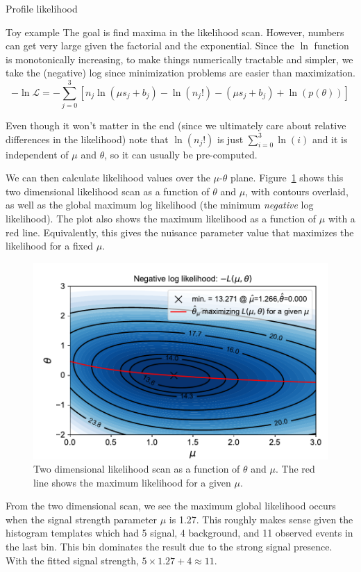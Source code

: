 \begin{section}{Profile likelihood}
\begin{subsection}{Toy example}
The goal is find maxima in the likelihood scan. However, numbers can get very
large given the factorial and the exponential. Since the $\ln$
function is monotonically increasing, to make things numerically
tractable and simpler, we take the (negative) log
since minimization problems are easier than maximization. 
\begin{equation}
-\ln\mathcal{L}=-\sum_{j=0}^{3}\left[
n_j \ln(\mu s_j + b_j) - \ln(n_j!) - (\mu s_j + b_j) + \ln(p(\theta))
\right]
\end{equation}


Even though it won't matter in the end (since we ultimately care about
relative differences in the likelihood) note that $\ln(n_j!)$ is just
$\sum_{i=0}^{3}\ln(i)$ and it is independent of $\mu$ and
$\theta$, so it can usually be pre-computed.

We can then calculate likelihood values over the $\mu$-$\theta$ plane. 
Figure~\ref{fig:toystat:2dlikelihood} shows this two dimensional
likelihood scan as a function of $\theta$ and $\mu$, with contours overlaid,
as well as the global maximum log likelihood (the
minimum \emph{negative} log likelihood).
The plot also shows the maximum likelihood as a function of $\mu$
with a red line. Equivalently, this gives the nuisance parameter value that
maximizes the likelihood for a fixed $\mu$.

\begin{figure}[!htb]
    \centering
    \includegraphics[width=0.80\linewidth]{figs/toy_statistics/likelihood_theta_vs_mu.pdf}
    \caption{
Two dimensional likelihood scan as a function of $\theta$ and $\mu$. The red line
shows the maximum likelihood for a given $\mu$.
    }
    \label{fig:toystat:2dlikelihood}
\end{figure}
    
From the two dimensional scan, we see the maximum global likelihood 
occurs when the signal strength parameter
$\mu$ is 1.27. This roughly makes sense given the histogram templates which had
5 signal, 4 background, and 11 observed events in the last bin.
This bin dominates the result due to the strong signal presence.
With the fitted signal strength, $5\times1.27 + 4 \approx 11$.


\end{subsection}
\end{section}
